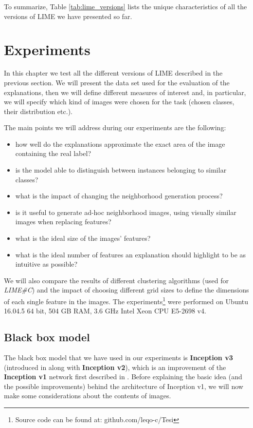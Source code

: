 \documentclass[12pt, twoside, a4paper]{report}
\begin{document}
To summarize, Table \ref{tab:lime_versions} lists the unique characteristics of all the versions of LIME we have presented so far.


\chapter{Experiments}\label{chapt:experiments}

In this chapter we test all the different versions of LIME described in the previous section. We will present the data set used for the evaluation of the explanations, then we will define different measures of interest and, in particular, we will specify which kind of images were chosen for the task (chosen classes, their distribution etc.). 

The main points we will address during our experiments are the following:

\begin{itemize}
\item how well do the explanations approximate the exact area of the image containing the real label?
\item is the model able to distinguish between instances belonging to similar classes?
\item what is the impact of changing the neighborhood generation process?
\item is it useful to generate ad-hoc neighborhood images, using visually similar images when replacing features?
\item what is the ideal size of the images' features?
\item what is the ideal number of features an explanation should highlight to be as intuitive as possible?
\end{itemize}

We will also compare the results of different clustering algorithms (used for \textit{LIME\#C}) and the impact of choosing different grid sizes to define the dimensions of each single feature in the images.
The experiments\footnote{Source code can be found at: github.com/leqo-c/Tesi} were performed on Ubuntu 16.04.5 64 bit, 504 GB RAM, 3.6 GHz Intel Xeon CPU E5-2698 v4.

\section{Black box model}

The black box model that we have used in our experiments is \textbf{Inception v3} (introduced in \cite{inception-v3} along with \textbf{Inception v2}), which is an improvement of the \textbf{Inception v1} network first described in \cite{inception-v1}. Before explaining the basic idea (and the possible improvements) behind the architecture of Inception v1, we will now make some considerations about the contents of images. 
\end{document}
